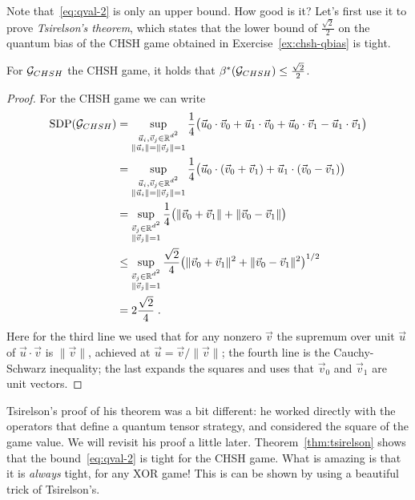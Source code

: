 Note that~\eqref{eq:qval-2} is only an upper bound. How good is it? Let's first use it to prove \emph{Tsirelson's theorem}, which states that the lower bound of $\frac{\sqrt{2}}{2}$ on the quantum bias of the CHSH game obtained in Exercise~\ref{ex:chsh-qbias} is tight. 

\begin{theorem}[Tsirelson]\label{thm:tsirelson}
For $\mathcal{G}_{CHSH}$ the CHSH game, it holds that $\beta^*(\mathcal{G}_{CHSH}) \leq \frac{\sqrt{2}}{2}$.
\end{theorem}

\begin{proof}
For the CHSH game we can write
\begin{align*}
\text{SDP}(\mathcal{G}_{CHSH}) &= \sup_{\substack{\vec{u}_i,\vec{v}_j\in \mathbb{R}^{d^2}\\ \|\vec{u}_i\|=\|\vec{v}_j\|=1}} \frac{1}{4} \big(\vec{u}_0 \cdot \vec{v}_0 + \vec{u}_1 \cdot \vec{v}_0 + \vec{u}_0 \cdot \vec{v}_1 - \vec{u}_1 \cdot \vec{v}_1\big)\\
 &= \sup_{\substack{\vec{u}_i,\vec{v}_j\in \mathbb{R}^{d^2}\\ \|\vec{u}_i\|=\|\vec{v}_j\|=1}} \frac{1}{4} \big(\vec{u}_0 \cdot (\vec{v}_0 + \vec{v}_1) +  \vec{u}_1 \cdot (\vec{v}_0 -\vec{v}_1)\big)\\
 & = \sup_{\substack{\vec{v}_j\in \mathbb{R}^{d^2}\\ \|\vec{v}_j\|=1}} \frac{1}{4} \big(\|\vec{v}_0 + \vec{v}_1\| + \|\vec{v}_0 -\vec{v}_1\| \big)\\
 & \leq \sup_{\substack{\vec{v}_j\in \mathbb{R}^{d^2}\\ \|\vec{v}_j\|=1}} \frac{\sqrt{2}}{4} \big( \|\vec{v}_0 + \vec{v}_1\|^2 + \|\vec{v}_0 -\vec{v}_1\|^2\big)^{1/2} \\
&= 2\frac{\sqrt{2}}{4} \;.
\end{align*}
Here for the third line we used that for any nonzero $\vec{v}$ the supremum over unit $\vec{u}$ of $\vec{u}\cdot \vec{v}$ is $\|\vec{v}\|$, achieved at $\vec{u} = \vec{v}/\|\vec{v}\|$; the fourth line is the Cauchy-Schwarz inequality; the last expands the squares and uses that $\vec{v}_0$ and $\vec{v}_1$ are unit vectors. 
\end{proof}

Tsirelson's proof of his theorem was a bit different: he worked directly with the operators that define a quantum tensor strategy, and considered the square of the game value. We will revisit his proof a little later. 
Theorem~\ref{thm:tsirelson} shows that the bound~\eqref{eq:qval-2} is tight for the CHSH game. What is amazing is that it is \emph{always} tight, for any XOR game! This is can be shown by using a beautiful trick of Tsirelson's. 

